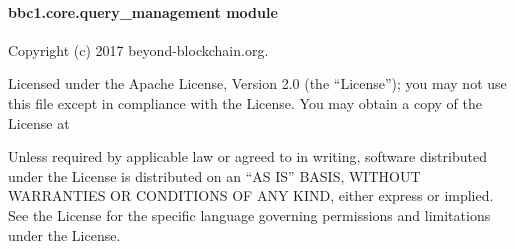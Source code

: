 \documentclass[letterpaper,10pt,english]{sphinxmanual}
\begin{document}

\begin{fulllineitems}
\label{\detokenize{bbc1.core.message_key_types:bbc1.core.message_key_types.to_2byte}}
\end{fulllineitems}


\begin{fulllineitems}
\label{\detokenize{bbc1.core.message_key_types:bbc1.core.message_key_types.to_4byte}}
\end{fulllineitems}


\begin{fulllineitems}
\label{\detokenize{bbc1.core.message_key_types:bbc1.core.message_key_types.unset_cipher}}
\end{fulllineitems}



\paragraph{bbc1.core.query\_management module}
\label{\detokenize{bbc1.core.query_management:module-bbc1.core.query_management}}\label{\detokenize{bbc1.core.query_management::doc}}\label{\detokenize{bbc1.core.query_management:bbc1-core-query-management-module}}
Copyright (c) 2017 beyond-blockchain.org.

Licensed under the Apache License, Version 2.0 (the “License”);
you may not use this file except in compliance with the License.
You may obtain a copy of the License at
\begin{quote}

\end{quote}

Unless required by applicable law or agreed to in writing, software
distributed under the License is distributed on an “AS IS” BASIS,
WITHOUT WARRANTIES OR CONDITIONS OF ANY KIND, either express or implied.
See the License for the specific language governing permissions and
limitations under the License.
\end{document}

